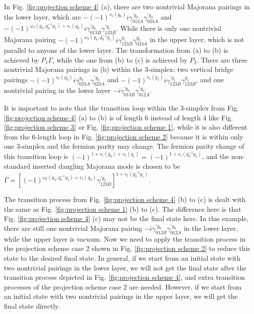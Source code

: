 \documentclass[%
 reprint,
 amsmath,amssymb,
 aps,
prb,
]{revtex4-2}
\begin{document}
In Fig. \ref{fig:projection scheme 4} (a), there are two nontrivial Majorana pairings in the lower layer, which are $-(-1)^{s_1(g_0)} i \gamma^{\prime g_0}_{012A} \gamma^{\prime g_0}_{023A}$ and $-(-1)^{\omega_2(g_0, g^{-1}_0 g_1) + s_1(g_0)} i \gamma^{\prime g_0}_{013B} \gamma^{\prime g_1}_{123B}$.
While there is only one nontrivial Majorana pairing $-(-1)^{\omega_2(g_0, g^{-1}_0 g_1)} i \gamma^{g_1}_{123B} \gamma^{g_0}_{023A}$ in the upper layer, which is not parallel to anyone of the lower layer.
The transformation from (a) to (b) is achieved by $P_1 \Gamma$, while the one from (b) to (c) is achieved by $P_2$.
There are three nontrivial Majorana pairings in (b) within the 3-simplex: two vertical bridge pairings $-(-1)^{s_1(g_0)} i \gamma^{g_0}_{023A} \gamma^{\prime g_0}_{023A}$ and $-(-1)^{s_1(g_1)} i \gamma^{\prime g_1}_{123B} \gamma^{g_1}_{123B}$, and one nontrivial pairing in the lower layer $-i \gamma^{\prime g_0}_{013B} \gamma^{\prime g_0}_{012A}$.

It is important to note that the transition loop within the 3-simplex from Fig. \ref{fig:projection scheme 4} (a) to (b) is of length 6 instead of length 4 like Fig. \ref{fig:projection scheme 3} or Fig. \ref{fig:projection scheme 1}, while it is also different from the 6-length loop in Fig. \ref{fig:projection scheme 2} because it is within only one 3-simplex and the fermion parity may change.
The fermion parity change of this transition loop is $(-1)^{1 + s_1(g_0) + s_1(g_1)} = (-1)^{1 + s_1(g^{-1}_0 g_1)}$, and the non-standard inserted dangling Majorana mode is chosen to be $\Gamma = \left[ 
(-1)^{\omega_2(g_0, g^{-1}_0 g_1) + s_1(g_0)} \gamma^{\prime g_1}_{123B} \right] ^{1 + s_1(g^{-1}_0 g_1)}$.

The transition process from Fig. \ref{fig:projection scheme 4} (b) to (c) is dealt with the same as Fig. \ref{fig:projection scheme 1} (b) to (c).
The difference here is that Fig. \ref{fig:projection scheme 4} (c) may not be the final state here.
In this example, there are still one nontrivial Majorana pairing $-i \gamma^{\prime g_0}_{013B} \gamma^{\prime g_0}_{012A}$ in the lower layer, while the upper layer is vacuum.
Now we need to apply the transition process in the projection scheme case 2 shown in Fig. \ref{fig:projection scheme 2} to reduce this state to the desired final state.
In general, if we start from an initial state with two nontrivial pairings in the lower layer, we will not get the final state after the transition process depicted in Fig. \ref{fig:projection scheme 4}, and extra transition processes of the projection scheme case 2 are needed.
However, if we start from an initial state with two nontrivial pairings in the upper layer, we will get the final state directly.
\end{document}
